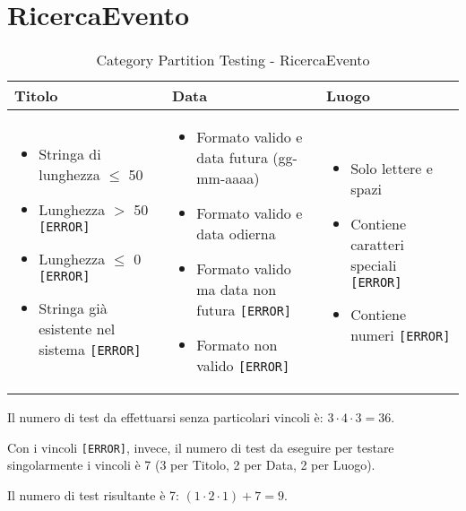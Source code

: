 \section{RicercaEvento}
\begin{table}[H]
	\centering
	\footnotesize
	\renewcommand{\arraystretch}{1.3}
	\begin{tabularx}{\textwidth}{|X|X|X|}
		\hline
		\textbf{Titolo} & \textbf{Data} & \textbf{Luogo} \\
		\hline
		\parbox[t]{\linewidth}{\begin{itemize}[leftmargin=*]
			\item Stringa di lunghezza $\leq$ 50 \checkmark
			\item Lunghezza $>$ 50 \texttt{[ERROR]}
			\item Lunghezza $\leq$ 0 \texttt{[ERROR]}
			\item Stringa già esistente nel sistema \texttt{[ERROR]}
		\end{itemize}} &

		\parbox[t]{\linewidth}{\begin{itemize}[leftmargin=*]
			\item Formato valido e data futura (gg-mm-aaaa) \checkmark
			\item Formato valido e data odierna \checkmark
			\item Formato valido ma data non futura \texttt{[ERROR]}
			\item Formato non valido \texttt{[ERROR]}
		\end{itemize}} &
		\parbox[t]{\linewidth}{\begin{itemize}[leftmargin=*]
			\item Solo lettere e spazi \checkmark
			\item Contiene caratteri speciali \texttt{[ERROR]}
			\item Contiene numeri \texttt{[ERROR]}
		\end{itemize}} \\
		\hline
	\end{tabularx}
	\caption{Category Partition Testing - RicercaEvento}
\end{table}
\noindent Il numero di test da effettuarsi senza particolari vincoli è:
$3 \cdot 4 \cdot 3 = 36$.

\noindent Con i vincoli \texttt{[ERROR]}, invece, il numero di test da eseguire per testare singolarmente i vincoli è 7 (3 per Titolo, 2 per Data, 2 per Luogo).

\noindent Il numero di test risultante è 7: $(1 \cdot 2 \cdot 1) + 7 = 9$.

